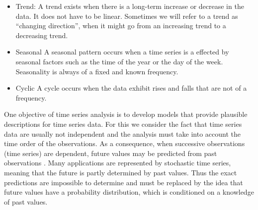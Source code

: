\begin{itemize}
	\item Trend: A trend exists when there is a long-term increase or decrease in the data. It does not have to be linear. Sometimes we will refer to a trend as ``changing direction'', when it might go from an increasing trend to a decreasing trend.
	\item Seasonal A seasonal pattern occurs when a time series is a effected by seasonal factors such as the time of the year or the day of the week. Seasonality is always of a fixed and known frequency. 
	\item Cyclic A cycle occurs when the data exhibit rises and falls that are not of a frequency.
\end{itemize}

One objective of time series analysis is to develop models that provide plausible descriptions for time series data. For this we consider the fact that time series data are usually not independent and the analysis must take into account the time order of the observations. As a consequence, when successive observations (time series) are dependent, future values may be predicted from past observations \cite{Mills2019}. Many applications are represented by stochastic time series, meaning that the future is partly determined by past values. Thus the exact predictions are impossible to determine and must be replaced by the idea that future values have a probability distribution, which is conditioned on a knowledge of past values. 

